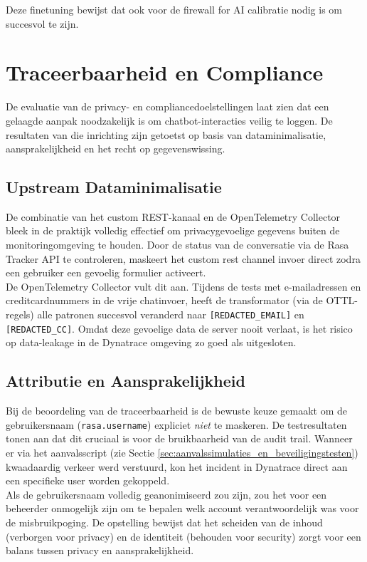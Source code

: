 Deze finetuning bewijst dat ook voor de firewall for AI calibratie nodig is om succesvol te zijn.

\section{Traceerbaarheid en Compliance}

De evaluatie van de privacy- en compliancedoelstellingen laat zien dat een gelaagde aanpak noodzakelijk is om chatbot-interacties veilig te loggen. De resultaten van die inrichting zijn getoetst op basis van dataminimalisatie, aansprakelijkheid en het recht op gegevenswissing.

\subsection{Upstream Dataminimalisatie}
De combinatie van het custom REST-kanaal en de OpenTelemetry Collector bleek in de praktijk volledig effectief om privacygevoelige gegevens buiten de monitoringomgeving te houden. Door de status van de conversatie via de Rasa Tracker API te controleren, maskeert het custom rest channel invoer direct zodra een gebruiker een gevoelig formulier activeert. \\

De OpenTelemetry Collector vult dit aan. Tijdens de tests met e-mailadressen en creditcardnummers in de vrije chatinvoer, heeft de transformator (via de OTTL-regels) alle patronen succesvol veranderd naar \texttt{[REDACTED\_EMAIL]} en \texttt{[REDACTED\_CC]}. Omdat deze gevoelige data de server nooit verlaat, is het risico op data-leakage in de Dynatrace omgeving zo goed als uitgesloten.

\subsection{Attributie en Aansprakelijkheid}
Bij de beoordeling van de traceerbaarheid is de bewuste keuze gemaakt om de gebruikersnaam (\texttt{rasa.username}) expliciet \textit{niet} te maskeren. De testresultaten tonen aan dat dit cruciaal is voor de bruikbaarheid van de audit trail. Wanneer er via het aanvalsscript (zie Sectie \ref{sec:aanvalssimulaties_en_beveiligingstesten}) kwaadaardig verkeer werd verstuurd, kon het incident in Dynatrace direct aan een specifieke user worden gekoppeld. \\

Als de gebruikersnaam volledig geanonimiseerd zou zijn, zou het voor een beheerder onmogelijk zijn om te bepalen welk account verantwoordelijk was voor de misbruikpoging. De opstelling bewijst dat het scheiden van de inhoud (verborgen voor privacy) en de identiteit (behouden voor security) zorgt voor een balans tussen privacy en aansprakelijkheid.

